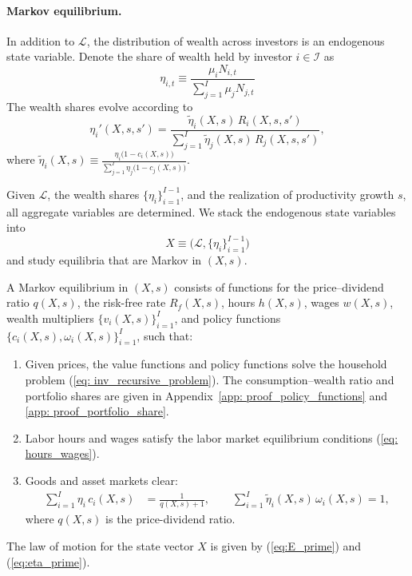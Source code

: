 \paragraph{Markov equilibrium.}

In addition to $\mathcal L$, the
distribution of wealth across investors is an endogenous state variable. 
Denote the share of wealth held by investor $i\in\mathcal I$ as
\[
\eta_{i,t}
\equiv
\frac{\mu_i N_{i,t}}{\sum_{j=1}^I \mu_j N_{j,t}}
\]
The wealth shares evolve according to
\begin{equation}
\eta_i'(X,s,s')
=
\frac{\tilde\eta_i(X,s)\,R_{i}(X,s,s')}
{\sum_{j=1}^I \tilde\eta_j(X,s)\,R_{j}(X,s,s')},
\label{eq:eta_prime}
\end{equation}
where $
\tilde\eta_i(X,s)
\equiv
\frac{\eta_i\bigl(1-c_i(X,s)\bigr)}
{\sum_{j=1}^I \eta_j\bigl(1-c_j(X,s)\bigr)}.
$

Given $\mathcal L$, the wealth shares $\{\eta_i\}_{i=1}^{I-1}$, and the
realization of productivity growth $s$, all aggregate variables are determined. We stack
the endogenous state variables into
\[
X
\equiv
\bigl(\mathcal L,\{\eta_i\}_{i=1}^{I-1}\bigr)
\]
and study equilibria that are Markov in $(X,s)$.

\begin{definition}
A Markov equilibrium in $(X,s)$ consists of functions for the price--dividend ratio $q(X,s)$, the risk-free rate $R_f(X,s)$, hours $h(X,s)$, wages $w(X,s)$,
wealth multipliers $\{v_i(X,s)\}_{i=1}^I$, and policy functions
$\{c_i(X,s),\omega_i(X,s)\}_{i=1}^I$, such that:

\begin{enumerate}
\item[(i)]
Given prices, the value functions and policy functions solve the household problem
(\ref{eq: inv_recursive_problem}). The consumption--wealth ratio and portfolio shares are
given in
Appendix~\ref{app: proof_policy_functions} and
\ref{app: proof_portfolio_share}.

\item[(ii)]
Labor hours and wages satisfy the labor market equilibrium conditions
(\ref{eq: hours_wages}).

\item[(iii)]
Goods and asset markets clear:
\begin{align}
\sum_{i=1}^I \eta_i\,c_i(X,s)
&=
\frac{1}{q(X,s)+1},
\qquad
\sum_{i=1}^I \tilde\eta_i(X,s)\,\omega_i(X,s)
=
1,
\label{eq: mkt_clearing_markov}
\end{align}
where $q(X,s)$ is the price-dividend ratio.
\end{enumerate}

The law of motion for the state vector $X$ is given by
(\ref{eq:E_prime}) and (\ref{eq:eta_prime}).
\end{definition}

